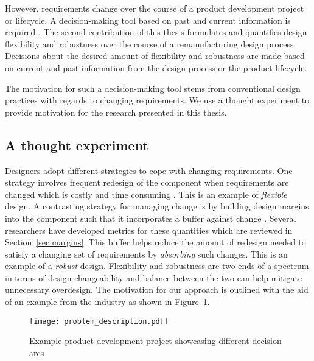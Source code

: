 However, requirements change over the course of a product development project or life\-cycle. A decision-making tool based on past and current information is required \cite{Eckert2019}. The second contribution of this thesis formulates and quantifies design flexibility and robustness over the course of a remanufacturing design process. Decisions about the desired amount of flexibility and robustness are made based on current and past information from the design process or the product lifecycle.

The motivation for such a decision-making tool stems from conventional design practices with regards to changing requirements. We use a thought experiment to provide motivation for the research presented in this thesis.

\subsection{A thought experiment} \label{subsec:thoughtexperiment}

Designers adopt different strategies to cope with changing requirements. One strategy involves frequent redesign of the component when requirements are changed which is costly and time consuming \cite{Clarkson2004}. This is an example of \textit{flexible} design. A contrasting strategy for managing change is by building design margins into the component such that it incorporates a buffer against change \cite{Eckert2019}. Several researchers have developed metrics for these quantities which are reviewed in Section~\ref{sec:margins}. This buffer helps reduce the amount of redesign needed to satisfy a changing set of requirements by \textit{absorbing} such changes. This is an example of a \textit{robust} design. Flexibility and robustness are two ends of a spectrum in terms of design changeability and balance between the two can help mitigate unnecessary overdesign. The motivation for our approach is outlined with the aid of an example from the industry as shown in Figure~\ref{fig:problemdescription}. 

\begin{figure}[h!]
	\centering
	\texttt{[image: problem\_description.pdf]}
	\caption{Example product development project showcasing different decision arcs}
	\label{fig:problemdescription}
\end{figure}

